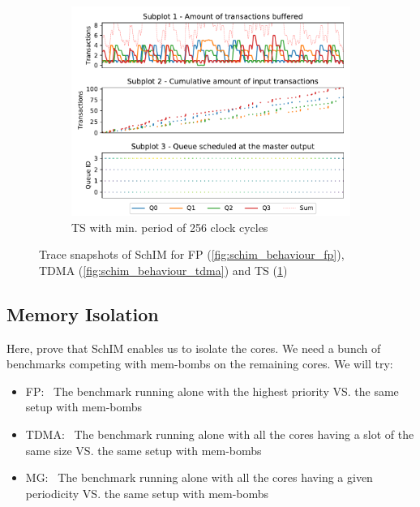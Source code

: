 \begin{figure}[]
\begin{subfigure}{0.5\textwidth}
      \end{subfigure}
      \vfill
      \begin{subfigure}{0.5\textwidth}
        \centering
        \includegraphics[scale=0.55]{images/SchIM_MG_buffering.pdf}
        \caption{TS with min. period of 256 clock cycles}
        \label{fig:schim_behaviour_mg}
      \end{subfigure}
      \caption{Trace snapshots of SchIM for FP (\ref{fig:schim_behaviour_fp}), TDMA (\ref{fig:schim_behaviour_tdma}) and TS (\ref{fig:schim_behaviour_mg})}
      \label{fig:schim_behaviour}
    \end{figure}

  \subsection{Memory Isolation}
    Here, prove that SchIM enables us to isolate the cores. We need a bunch of benchmarks competing with mem-bombs on the remaining cores. We will try:
    \begin{itemize}
      \item FP:~ The benchmark running alone with the highest priority VS. the same setup with mem-bombs
      \item TDMA:~ The benchmark running alone with all the cores having a slot of the same size VS. the same setup with mem-bombs
      \item MG:~ The benchmark running alone with all the cores having a given periodicity VS. the same setup with mem-bombs
    \end{itemize}
